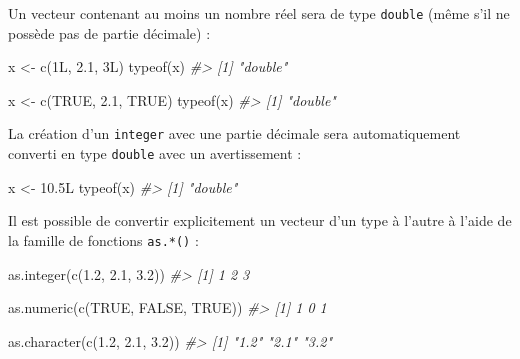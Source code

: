\documentclass[
  french,
]{scrbook}
\newenvironment{Shaded}{\begin{snugshade}}{\end{snugshade}}
\newcommand{\CommentTok}[1]{\textcolor[rgb]{0.56,0.35,0.01}{\textit{#1}}}
\newcommand{\ConstantTok}[1]{\textcolor[rgb]{0.00,0.00,0.00}{#1}}
\newcommand{\FloatTok}[1]{\textcolor[rgb]{0.00,0.00,0.81}{#1}}
\newcommand{\FunctionTok}[1]{\textcolor[rgb]{0.00,0.00,0.00}{#1}}
\newcommand{\NormalTok}[1]{#1}
\newcommand{\OtherTok}[1]{\textcolor[rgb]{0.56,0.35,0.01}{#1}}
\begin{document}
Un vecteur contenant au moins un nombre réel sera de type \texttt{double} (même s'il ne possède pas de partie décimale) :

\begin{Shaded}
\begin{Highlighting}[]
\NormalTok{x }\OtherTok{\textless{}{-}} \FunctionTok{c}\NormalTok{(1L, }\FloatTok{2.1}\NormalTok{, 3L)}
\FunctionTok{typeof}\NormalTok{(x)}
\CommentTok{\#\textgreater{} [1] "double"}

\NormalTok{x }\OtherTok{\textless{}{-}} \FunctionTok{c}\NormalTok{(}\ConstantTok{TRUE}\NormalTok{, }\FloatTok{2.1}\NormalTok{, }\ConstantTok{TRUE}\NormalTok{)}
\FunctionTok{typeof}\NormalTok{(x)}
\CommentTok{\#\textgreater{} [1] "double"}
\end{Highlighting}
\end{Shaded}

La création d'un \texttt{integer} avec une partie décimale sera automatiquement converti en type \texttt{double} avec un avertissement :

\begin{Shaded}
\begin{Highlighting}[]
\NormalTok{x }\OtherTok{\textless{}{-}} \FloatTok{10.5}\NormalTok{L}
\FunctionTok{typeof}\NormalTok{(x)}
\CommentTok{\#\textgreater{} [1] "double"}
\end{Highlighting}
\end{Shaded}

Il est possible de convertir explicitement un vecteur d'un type à l'autre à l'aide de la famille de fonctions \texttt{as.*()} :

\begin{Shaded}
\begin{Highlighting}[]
\FunctionTok{as.integer}\NormalTok{(}\FunctionTok{c}\NormalTok{(}\FloatTok{1.2}\NormalTok{, }\FloatTok{2.1}\NormalTok{, }\FloatTok{3.2}\NormalTok{))}
\CommentTok{\#\textgreater{} [1] 1 2 3}

\FunctionTok{as.numeric}\NormalTok{(}\FunctionTok{c}\NormalTok{(}\ConstantTok{TRUE}\NormalTok{, }\ConstantTok{FALSE}\NormalTok{, }\ConstantTok{TRUE}\NormalTok{))}
\CommentTok{\#\textgreater{} [1] 1 0 1}

\FunctionTok{as.character}\NormalTok{(}\FunctionTok{c}\NormalTok{(}\FloatTok{1.2}\NormalTok{, }\FloatTok{2.1}\NormalTok{, }\FloatTok{3.2}\NormalTok{))}
\CommentTok{\#\textgreater{} [1] "1.2" "2.1" "3.2"}
\end{Highlighting}
\end{Shaded}
\end{document}
